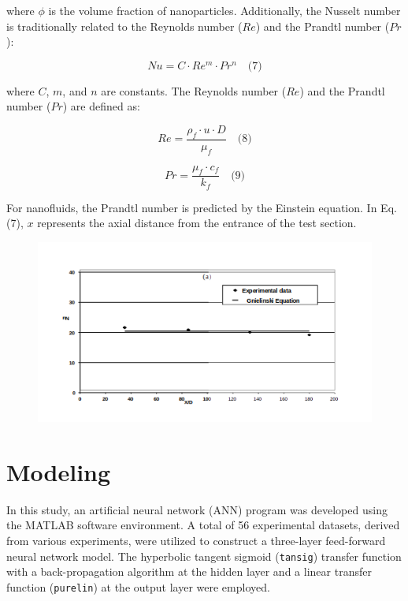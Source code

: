 \documentclass{article}
\begin{document}
where $\phi$ is the volume fraction of nanoparticles. Additionally, the Nusselt number is traditionally related to the Reynolds number ($Re$) and the Prandtl number ($Pr$):

\begin{equation}
Nu = C \cdot Re^m \cdot Pr^n \quad \text{(7)}
\end{equation}

where $C$, $m$, and $n$ are constants. The Reynolds number ($Re$) and the Prandtl number ($Pr$) are defined as:

\begin{equation}
Re = \frac{\rho_f \cdot u \cdot D}{\mu_f} \quad \text{(8)}
\end{equation}

\begin{equation}
Pr = \frac{\mu_f \cdot c_f}{k_f} \quad \text{(9)}
\end{equation}

For nanofluids, the Prandtl number is predicted by the Einstein equation. In Eq. (7), $x$ represents the axial distance from the entrance of the test section.

\begin{figure}[th!]
	\centering
	\includegraphics[width=0.8\linewidth]{fig2}
	\caption{}
	\label{fig:fig2}
\end{figure}

\section{Modeling}

In this study, an artificial neural network (ANN) program was developed using the MATLAB software environment. A total of 56 experimental datasets, derived from various experiments, were utilized to construct a three-layer feed-forward neural network model. The hyperbolic tangent sigmoid (\texttt{tansig}) transfer function with a back-propagation algorithm at the hidden layer and a linear transfer function (\texttt{purelin}) at the output layer were employed.
\end{document}
